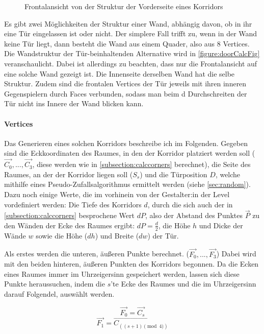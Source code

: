 \begin{figure}[H]
    \centering
    
    \caption{Frontalansicht von der Struktur der Vorderseite eines Korridors}
    \label{figure:doorCalcFig}
\end{figure}


Es gibt zwei Möglichkeiten der Struktur einer Wand, abhängig davon, ob in ihr eine Tür eingelassen ist oder nicht. Der simplere Fall trifft zu, wenn in der Wand keine Tür liegt, dann besteht die Wand aus einem Quader, also aus 8 Vertices.
Die Wandstruktur der Tür-beinhaltenden Alternative wird in \autoref{figure:doorCalcFig}
veranschaulicht. Dabei ist allerdings zu beachten, dass nur die Frontalansicht auf eine solche Wand gezeigt ist. Die Innenseite derselben Wand hat die selbe Struktur. Zudem sind die frontalen Vertices der Tür jeweils mit ihren inneren Gegenspielern durch Faces verbunden, sodass man beim d
Durchschreiten der Tür nicht ins Innere der Wand blicken kann.

\paragraph*{Vertices}

Das Generieren eines solchen Korridors beschreibe ich im Folgenden. Gegeben sind die Eckkoordinaten des Raumes, in den der Korridor platziert werden soll ($\vec{C_0}, ..., \vec{C_3}$, diese werden wie in \autoref{subsection:calccorners} berechnet), die Seite des Raumes, an der der Korridor liegen soll ($S_s$) und die Türposition $D$, welche mithilfe eines Pseudo-Zufallsalgorithmus ermittelt werden (siehe \autoref{sec:random}). Dazu noch einige Werte, die im vorhinein von der Gestalter:in der Level vordefiniert werden: Die Tiefe des Korridors $d$, durch die sich auch der in \autoref{subsection:calccorners} besprochene Wert $dP$, also der Abstand des Punktes $\vec{P}$ zu den Wänden der Ecke des Raumes ergibt: $dP = \frac{d}{2}$, die Höhe $h$ und Dicke der Wände $w$ sowie die Höhe ($dh$) und Breite ($dw$) der Tür.

Als erstes werden die unteren, äußeren Punkte berechnet. ($\vec{F_0}, ..., \vec{F_3}$)
Dabei wird mit den beiden hinteren, äußeren Punkten des Korridors begonnen. Da die Ecken eines Raumes immer im Uhrzeigersinn gespeichert werden, lassen sich diese Punkte heraussuchen, indem die $s$'te Ecke des Raumes und die im Uhrzeigersinn darauf Folgendel, auswählt werden.

$$ \vec{F_0} = \vec{C_s} $$
$$ \vec{F_1} = \vec{C_{((s+1)\pmod 4)}} $$


